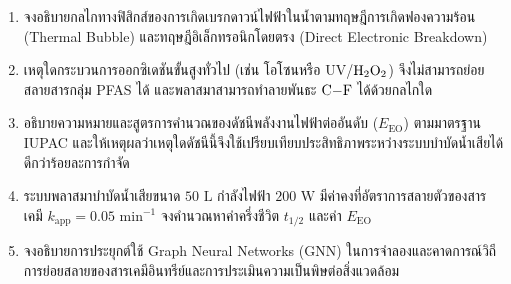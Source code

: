 \begin{enumerate}
    \item จงอธิบายกลไกทางฟิสิกส์ของการเกิดเบรกดาวน์ไฟฟ้าในน้ำตามทฤษฎีการเกิดฟองความร้อน (Thermal Bubble) และทฤษฎีอิเล็กทรอนิกโดยตรง (Direct Electronic Breakdown)
    \item เหตุใดกระบวนการออกซิเดชันขั้นสูงทั่วไป (เช่น โอโซนหรือ UV/$\ce{H2O2}$) จึงไม่สามารถย่อยสลายสารกลุ่ม PFAS ได้ และพลาสมาสามารถทำลายพันธะ $\ce{C-F}$ ได้ด้วยกลไกใด
    \item อธิบายความหมายและสูตรการคำนวณของดัชนีพลังงานไฟฟ้าต่ออันดับ ($E_{\text{EO}}$) ตามมาตรฐาน IUPAC และให้เหตุผลว่าเหตุใดดัชนีนี้จึงใช้เปรียบเทียบประสิทธิภาพระหว่างระบบบำบัดน้ำเสียได้ดีกว่าร้อยละการกำจัด
    \item ระบบพลาสมาบำบัดน้ำเสียขนาด $50 \text{ L}$ กำลังไฟฟ้า $200 \text{ W}$ มีค่าคงที่อัตราการสลายตัวของสารเคมี $k_{\text{app}} = 0.05 \text{ min}^{-1}$ จงคำนวณหาค่าครึ่งชีวิต $t_{1/2}$ และค่า $E_{\text{EO}}$
    \item จงอธิบายการประยุกต์ใช้ Graph Neural Networks (GNN) ในการจำลองและคาดการณ์วิถีการย่อยสลายของสารเคมีอินทรีย์และการประเมินความเป็นพิษต่อสิ่งแวดล้อม
\end{enumerate}
